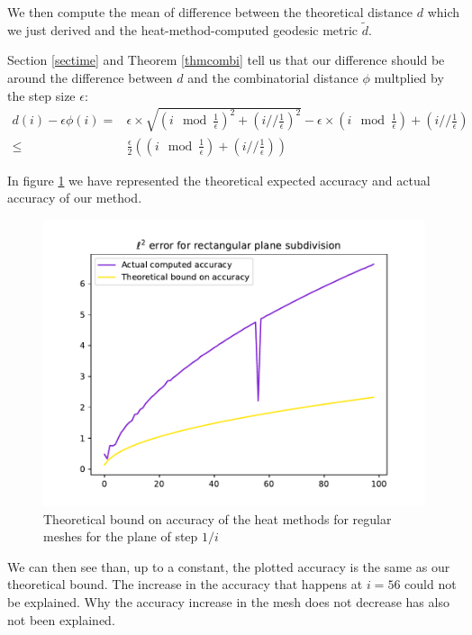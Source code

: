 \documentclass[math, info, english]{cours}
\begin{document}
We then compute the mean of difference between the theoretical distance $d$ which we just derived and the heat-method-computed geodesic metric $\tilde{d}$.

Section \ref{sectime} and Theorem \ref{thmcombi} tell us that our difference should be around the difference between $d$ and the combinatorial distance $\phi$ multplied by the step size $\epsilon$:
\begin{equation*}
	\begin{aligned}
	d\left( i \right) - \epsilon\phi\left( i \right) =& \epsilon \times
			\sqrt{\left( i \mod \frac{1}{\epsilon} \right)^{2} + \left( i // \frac{1}{\epsilon} \right)^{2} }
			-
			\epsilon \times\left( i \mod \frac{1}{\epsilon} \right) + \left(i // \frac{1}{\epsilon} \right)\\
	\leq& \frac{\epsilon}{2} \left(\left( i \mod \frac{1}{\epsilon} \right) + \left(i // \frac{1}{\epsilon} \right) \right)
	\end{aligned}
\end{equation*}

In figure \ref{planediff} we have represented the theoretical expected accuracy and actual accuracy of our method.
\begin{figure}[H]
	\centering
	\includegraphics{Figures/compare_err_comp_planes_i<=100}
	\caption{Theoretical bound on accuracy of the heat methods for regular meshes for the plane of step $1/i$}
	\label{planediff}
\end{figure}
We can then see than, up to a constant, the plotted accuracy is the same as our theoretical bound.
The increase in the accuracy that happens at $i = 56$ could not be explained.
Why the accuracy increase in the mesh does not decrease has also not been explained.

\appendix
\newpage


\end{document}
